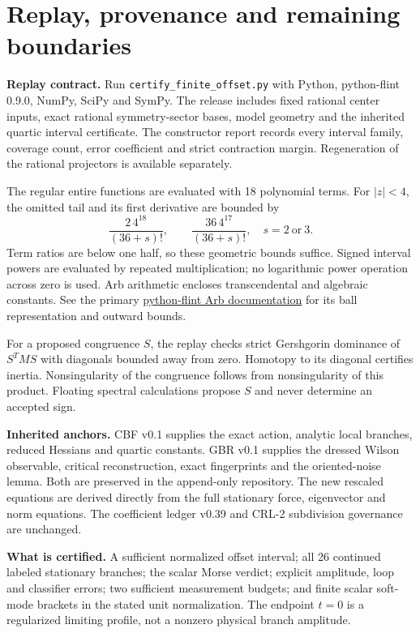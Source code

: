 \documentclass[11pt,a4paper]{article}
\begin{document}
\section{Replay, provenance and remaining boundaries}
\textbf{Replay contract.} Run \texttt{certify\_finite\_offset.py} with Python, python-flint 0.9.0, NumPy, SciPy and SymPy. The release includes fixed rational center inputs, exact rational symmetry-sector bases, model geometry and the inherited quartic interval certificate. The constructor report records every interval family, coverage count, error coefficient and strict contraction margin. Regeneration of the rational projectors is available separately.

The regular entire functions are evaluated with 18 polynomial terms. For $|z|<4$, the omitted tail and its first derivative are bounded by
\[
\frac{2\,4^{18}}{(36+s)!},\qquad
\frac{36\,4^{17}}{(36+s)!},\quad s=2\ \text{or}\ 3.
\]
Term ratios are below one half, so these geometric bounds suffice. Signed interval powers are evaluated by repeated multiplication; no logarithmic power operation across zero is used. Arb arithmetic encloses transcendental and algebraic constants. See the primary \href{https://python-flint.readthedocs.io/en/latest/arb.html}{python-flint Arb documentation} for its ball representation and outward bounds.

For a proposed congruence $S$, the replay checks strict Gershgorin dominance of $S^TMS$ with diagonals bounded away from zero. Homotopy to its diagonal certifies inertia. Nonsingularity of the congruence follows from nonsingularity of this product. Floating spectral calculations propose $S$ and never determine an accepted sign.

\textbf{Inherited anchors.} CBF v0.1 supplies the exact action, analytic local branches, reduced Hessians and quartic constants. GBR v0.1 supplies the dressed Wilson observable, critical reconstruction, exact fingerprints and the oriented-noise lemma. Both are preserved in the append-only repository. The new rescaled equations are derived directly from the full stationary force, eigenvector and norm equations. The coefficient ledger v0.39 and CRL-2 subdivision governance are unchanged.

\textbf{What is certified.} A sufficient normalized offset interval; all 26 continued labeled stationary branches; the scalar Morse verdict; explicit amplitude, loop and classifier errors; two sufficient measurement budgets; and finite scalar soft-mode brackets in the stated unit normalization. The endpoint $t=0$ is a regularized limiting profile, not a nonzero physical branch amplitude.
\end{document}

